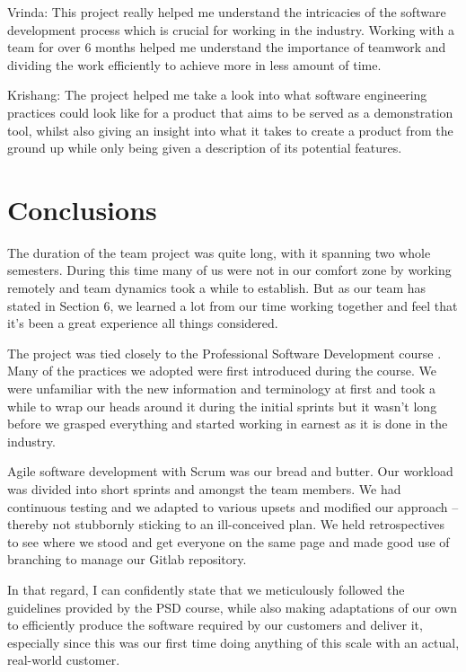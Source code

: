 \documentclass{l3proj}
\begin{document}
Vrinda: This project really helped me understand the intricacies of the software development process which is crucial for working in the industry. Working with a team for over 6 months helped me understand the importance of teamwork and dividing the work efficiently to achieve more in less amount of time.

Krishang: The project helped me take a look into what software engineering practices could look like for a product that aims to be served as a demonstration tool, whilst also giving an insight into what it takes to create a product from the ground up while only being given a description of its potential features.



\section{Conclusions}

The duration of the team project was quite long, with it spanning two whole semesters. During this time many of us were not in our comfort zone by working remotely and team dynamics took a while to establish. But as our team has stated in Section 6, we learned a lot from our time working together and feel that it’s been a great experience all things considered.

The project was tied closely to the Professional Software Development course \cite{psd}. Many of the practices we adopted were first introduced during the course. We were unfamiliar with the new information and terminology at first and took a while to wrap our heads around it during the initial sprints but it wasn’t long before we grasped everything and started working in earnest as it is done in the industry.

Agile software development with Scrum was our bread and butter. Our workload was divided into short sprints and amongst the team members. We had continuous testing and we adapted to various upsets and modified our approach – thereby not stubbornly sticking to an ill-conceived plan. We held retrospectives to see where we stood and get everyone on the same page and made good use of branching to manage our Gitlab repository.

In that regard, I can confidently state that we meticulously followed the guidelines provided by the PSD course, while also making adaptations of our own to efficiently produce the software required by our customers and deliver it, especially since this was our first time doing anything of this scale with an actual, real-world customer.
\end{document}

